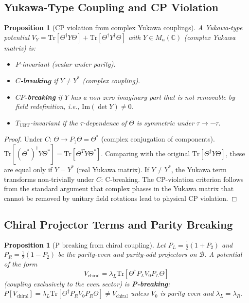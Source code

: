 \documentclass[12pt,a4paper]{article}
\newtheorem{proposition}[theorem]{Proposition}
\theoremstyle{definition}
\theoremstyle{remark}
\begin{document}
\subsection{Yukawa-Type Coupling and CP Violation}

\begin{proposition}[CP violation from complex Yukawa couplings]
\label{prop:act:CP_yukawa}
A Yukawa-type potential
$V_Y = \mathrm{Tr}[\Theta^\dagger Y \Theta] + \mathrm{Tr}[\Theta^\dagger Y^\dagger \Theta]$
with $Y \in M_{n}(\mathbb{C})$ (complex Yukawa matrix) is:
\begin{itemize}
  \item $P$-invariant (scalar under parity).
  \item \textbf{$C$-breaking} if $Y \neq Y^*$ (complex coupling).
  \item \textbf{$CP$-breaking} if $Y$ has a non-zero imaginary part that
    is not removable by field redefinition, i.e., $\mathrm{Im}(\det Y) \neq 0$.
  \item $T_{\mathrm{UBT}}$-invariant if the $\tau$-dependence of $\Theta$
    is symmetric under $\tau \to -\tau$.
\end{itemize}
\end{proposition}

\begin{proof}
Under $C$: $\Theta \to P_1\Theta = \Theta^*$ (complex conjugation of components).
$\mathrm{Tr}[(\Theta^*)^\dagger Y \Theta^*] = \mathrm{Tr}[\Theta^T Y \Theta^*]$.
Comparing with the original $\mathrm{Tr}[\Theta^\dagger Y \Theta]$, these are equal
only if $Y = Y^*$ (real Yukawa matrix).
If $Y \neq Y^*$, the Yukawa term transforms non-trivially under $C$: C-breaking.
The CP-violation criterion follows from the standard argument that complex phases
in the Yukawa matrix that cannot be removed by unitary field rotations lead to
physical CP violation.
\end{proof}

\subsection{Chiral Projector Terms and Parity Breaking}

\begin{proposition}[P breaking from chiral coupling]
\label{prop:act:P_chiral}
Let $P_L = \tfrac{1}{2}(1 + P_2)$ and $P_R = \tfrac{1}{2}(1 - P_2)$ be
the parity-even and parity-odd projectors on $\mathcal{B}$.
A potential of the form
\begin{equation}
  V_{\mathrm{chiral}} = \lambda_L \mathrm{Tr}[\Theta^\dagger P_L V_0 P_L \Theta]
\end{equation}
(coupling exclusively to the even sector) is \textbf{P-breaking}:
$P[V_{\mathrm{chiral}}] = \lambda_L \mathrm{Tr}[\Theta^\dagger P_R V_0 P_R \Theta]
\neq V_{\mathrm{chiral}}$ unless $V_0$ is parity-even and $\lambda_L = \lambda_R$.
\end{proposition}
\end{document}
